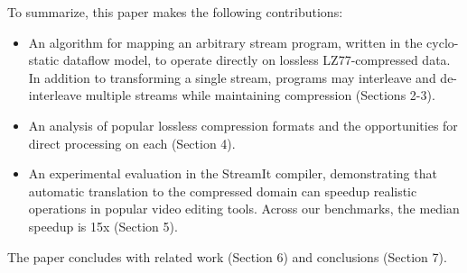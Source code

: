 To summarize, this paper makes the following contributions:
\begin{itemize}

\item An algorithm for mapping an arbitrary stream program, written in
  the cyclo-static dataflow model, to operate directly on lossless
  LZ77-compressed data.  In addition to transforming a single stream,
  programs may interleave and de-interleave multiple streams while
  maintaining compression (Sections 2-3).

\item An analysis of popular lossless compression formats and the
opportunities for direct processing on each (Section 4).

\item An experimental evaluation in the StreamIt compiler,
  demonstrating that automatic translation to the compressed domain
  can speedup realistic operations in popular video editing tools.
  Across our benchmarks, the median speedup is 15x (Section 5).

\end{itemize}

The paper concludes with related work (Section 6) and conclusions
(Section 7).
